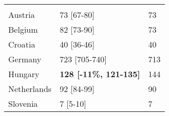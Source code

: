 \begin{tabular}{L{4.9cm} R{5.2cm} L{2cm}}
\addlinespace[0.3em]
\\
\hspace{1em}Austria & 73     [67-80] & 73\\
\hspace{1em}Belgium & 82     [73-90] & 73\\
\hspace{1em}Croatia & 40     [36-46] & 40\\
\hspace{1em}Germany & 723    [705-740] & 713\\
\hspace{1em}Hungary & \textbf{128    [-11\%, 121-135]} & 144\\
\hspace{1em}Netherlands & 92     [84-99] & 90\\
\hspace{1em}Slovenia & 7      [5-10] & 7\\
\bottomrule
\end{tabular}
